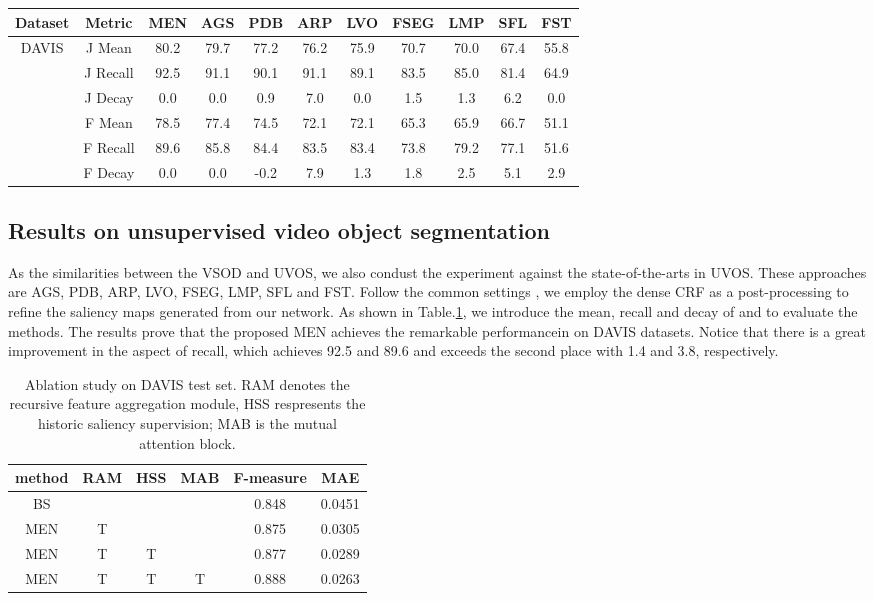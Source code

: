 \documentclass[12pt]{article}
\begin{document}
\begin{table}[]
\label{compare_all_seg}
\begin{tabular}{|c|c|ccccccccc}
\hline
Dataset & Metric & \multicolumn{1}{c|}{MEN} & \multicolumn{1}{c|}{AGS} & \multicolumn{1}{c|}{PDB} & \multicolumn{1}{c|}{ARP} & \multicolumn{1}{c|}{LVO} & \multicolumn{1}{c|}{FSEG} & \multicolumn{1}{c|}{LMP} & \multicolumn{1}{c|}{SFL} & \multicolumn{1}{c|}{FST} \\ \hline
\multirow{6}{*}{DAVIS} & J Mean & 80.2 & 79.7 & 77.2 & 76.2 & 75.9 & 70.7 & 70.0 & 67.4 & 55.8 \\
 & J Recall & 92.5 & 91.1 & 90.1 & 91.1 & 89.1 & 83.5 & 85.0 & 81.4 & 64.9 \\
 & J Decay & 0.0 & 0.0 & 0.9 & 7.0 & 0.0 & 1.5 & 1.3 & 6.2 & 0.0 \\ \cline{2-11} 
 & F Mean & 78.5 & 77.4 & 74.5 & 72.1 & 72.1 & 65.3 & 65.9 & 66.7 & 51.1 \\
 & F Recall & 89.6 & 85.8 & 84.4 & 83.5 & 83.4 & 73.8 & 79.2 & 77.1 & 51.6 \\
 & F Decay & 0.0 & 0.0 & -0.2 & 7.9 & 1.3 & 1.8 & 2.5 & 5.1 & 2.9 \\ \hline
\end{tabular}
\end{table}

\subsection{Results on unsupervised video object segmentation}

As the similarities between the VSOD and UVOS, we also condust the experiment against the state-of-the-arts in UVOS. These approaches are AGS, PDB, ARP, LVO, FSEG, LMP, SFL and FST. Follow the common settings \cite{AGS,PDB}, we employ the dense CRF \cite{crf} as a post-processing to refine the saliency maps generated from our network. As shown in Table.\ref{compare_all_seg}, we introduce the mean, recall and decay of  and  to evaluate the methods. The results prove that the proposed MEN achieves the remarkable performancein on DAVIS datasets. Notice that there is a great improvement in the aspect of recall, which achieves 92.5 and 89.6 and exceeds the second place with 1.4 and 3.8, respectively.

\begin{table}[]
\caption{Ablation study on DAVIS test set. RAM	denotes the recursive feature aggregation module, HSS respresents the historic saliency supervision; MAB is the mutual attention block.}
\label{diff_compare}
\begin{tabular}{cccc|cc}
\hline
method & RAM & HSS & MAB & F-measure & MAE \\ \hline
BS &  &  &  & 0.848 & 0.0451 \\
MEN & T &  &  & 0.875 & 0.0305 \\
MEN & T & T &  & 0.877 & 0.0289 \\
MEN & T & T & T & 0.888 & 0.0263 \\ \hline
\end{tabular}
\end{table}
\end{document}
